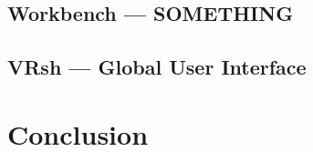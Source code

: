 \documentclass[conference,12pt]{IEEEtran}
\newcommand\name{VRsh}
\begin{document}
\subsection{Workbench --- SOMETHING} %

\subsection{{\name} --- Global User Interface}

\section{Conclusion}\label{sec:conclusion}

{\printbibliography}
\end{document}
